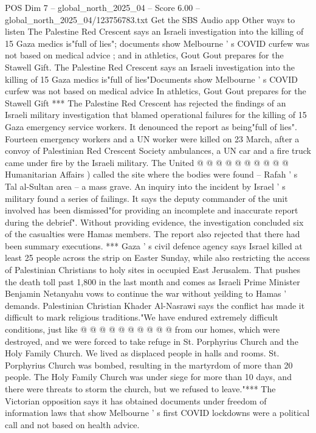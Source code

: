 \begin{textsample}{POS Dim 7 – global\_north\_2025\_04 – Score 6.00 – global\_north\_2025\_04/123756783.txt}  \label{ex:f7_pos_362}
Get the SBS Audio app Other ways to listen The Palestine Red Crescent says an Israeli investigation into the killing of 15 Gaza medics is"full of lies"; documents show Melbourne ' s COVID curfew was not based on medical advice ; and in athletics, Gout Gout prepares for the Stawell Gift.
The Palestine Red Crescent says an Israeli investigation into the killing of 15 Gaza medics is"full of lies"Documents show Melbourne ' s COVID curfew was not based on medical advice In athletics, Gout Gout prepares for the Stawell Gift *** The Palestine Red Crescent has rejected the findings of an Israeli military investigation that blamed operational failures for the killing of 15 Gaza emergency service workers.
It denounced the report as being"full of lies".
Fourteen emergency workers and a UN worker were killed on 23 March, after a convoy of Palestinian Red Crescent Society ambulances, a UN car and a fire truck came under fire by the Israeli military.
The United @ @ @ @ @ @ @ @ @ @ Humanitarian Affairs ) called the site where the bodies were found -- Rafah ' s Tal al-Sultan area -- a mass grave.
An inquiry into the incident by Israel ' s military found a series of failings.
It says the deputy commander of the unit involved has been dismissed"for providing an incomplete and inaccurate report during the debrief".
Without providing evidence, the investigation concluded six of the casualties were Hamas members.
The report also rejected that there had been summary executions. *** Gaza ' s civil defence agency says Israel killed at least 25 people across the strip on Easter Sunday, while also restricting the access of Palestinian Christians to holy sites in occupied East Jerusalem.
That pushes the death toll past 1,800 in the last month and comes as Israeli Prime Minister Benjamin Netanyahu vows to continue the war without yeilding to Hamas ' demands.
Palestinian Christian Khader Al-Nasrawi says the conflict has made it difficult to mark religious traditions."We have endured extremely difficult conditions, just like @ @ @ @ @ @ @ @ @ @ from our homes, which were destroyed, and we were forced to take refuge in St.
Porphyrius Church and the Holy Family Church.
We lived as displaced people in halls and rooms.
St.
Porphyrius Church was bombed, resulting in the martyrdom of more than 20 people.
The Holy Family Church was under siege for more than 10 days, and there were threats to storm the church, but we refused to leave."*** The Victorian opposition says it has obtained documents under freedom of information laws that show Melbourne ' s first COVID lockdowns were a political call and not based on health advice.

\end{textsample}
